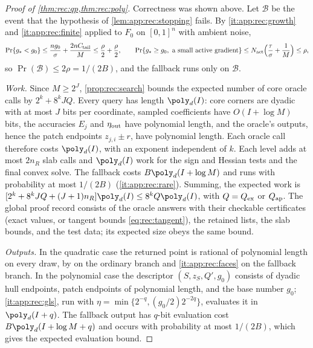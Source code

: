 \begin{proof}[Proof of \cref{thm:rec:qp,thm:rec:poly}]
Correctness was shown above. Let $\mathcal B$ be the event that the
hypothesis of \cref{lem:app:rec:stopping} fails. By \ref{it:app:rec:growth}
and \ref{it:app:rec:finite} applied to $F_0$ on $[0,1]^n$ with ambient
noise,
\[
 \Pr\{g_*<g_0\}\le\frac{ng_0}\sigma+\frac{2nC_{\rm tail}}M\le\frac\rho2+\frac\rho2,
 \qquad
 \Pr\{g_*\ge g_0,\ \text{a small active gradient}\}
 \le N_{\rm act}\Bigl(\frac\tau\sigma+\frac1M\Bigr)\le\rho,
\]
so $\Pr(\mathcal B)\le2\rho=1/(2B)$, and the fallback runs only on
$\mathcal B$.

\emph{Work.} Since $M\ge2^J$, \cref{prop:rec:search} bounds the expected
number of core oracle calls by $2^k+8^kJQ$. Every query has length
$\poly_d(I)$: core corners are dyadic with at most $J$ bits per coordinate,
sampled coefficients have $O(I+\log M)$ bits, the accuracies $E_j$ and
$\eta_{\rm out}$ have polynomial length, and the oracle's outputs, hence the
patch endpoints $z_{j,i}\pm r$, have polynomial length. Each oracle call
therefore costs $\poly_d(I)$, with an exponent independent of $k$. Each level
adds at most $2n_R$ slab calls and $\poly_d(I)$ work for the sign and Hessian
tests and the final convex solve. The fallback costs $B\poly_d(I+\log M)$ and
runs with probability at most $1/(2B)$ (\ref{it:app:rec:rare}). Summing,
the expected work is $[2^k+8^kJQ+(J+1)n_R]\poly_d(I)\le8^kQ\poly_d(I)$, with
$Q=Q_{\rm ex}$ or $Q_{\rm ap}$. The global proof record consists of the oracle
answers with their checkable certificates (exact values, or tangent bounds
\eqref{eq:rec:tangent}), the retained lists, the slab bounds, and the test
data; its expected size obeys the same bound.

\emph{Outputs.} In the quadratic case the returned point is rational of
polynomial length on every draw, by \citet{kozlov1980-the-polynomial-solvability-of-convex} on the
ordinary branch and \ref{it:app:rec:faces} on the fallback branch. In the
polynomial case the descriptor $(S,z_S,Q',g_0)$ consists of dyadic hull
endpoints, patch endpoints of polynomial length, and the base number $g_0$;
\ref{it:app:rec:gls}, run with $\eta=\min\{2^{-q},(g_0/2)2^{-2q}\}$, evaluates it in $\poly_d(I+q)$. The fallback output
has $q$-bit evaluation cost $B\poly_d(I+\log M+q)$ and occurs with
probability at most $1/(2B)$, which gives the expected evaluation bound.
\end{proof}

